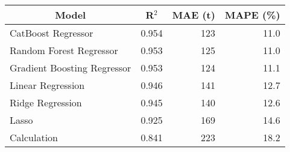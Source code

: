 
\begin{tabular}[t]{lrrr}
\toprule
\multicolumn{1}{c}{Model} & \multicolumn{1}{c}{R$^2$} & \multicolumn{1}{c}{MAE (t)} & \multicolumn{1}{c}{MAPE (\%)}\\
\midrule
CatBoost Regressor & 0.954 & 123 & 11.0\\
Random Forest Regressor & 0.953 & 125 & 11.0\\
Gradient Boosting Regressor & 0.953 & 124 & 11.1\\
Linear Regression & 0.946 & 141 & 12.7\\
Ridge Regression & 0.945 & 140 & 12.6\\
Lasso & 0.925 & 169 & 14.6\\
Calculation & 0.841 & 223 & 18.2\\
\bottomrule
\end{tabular}
